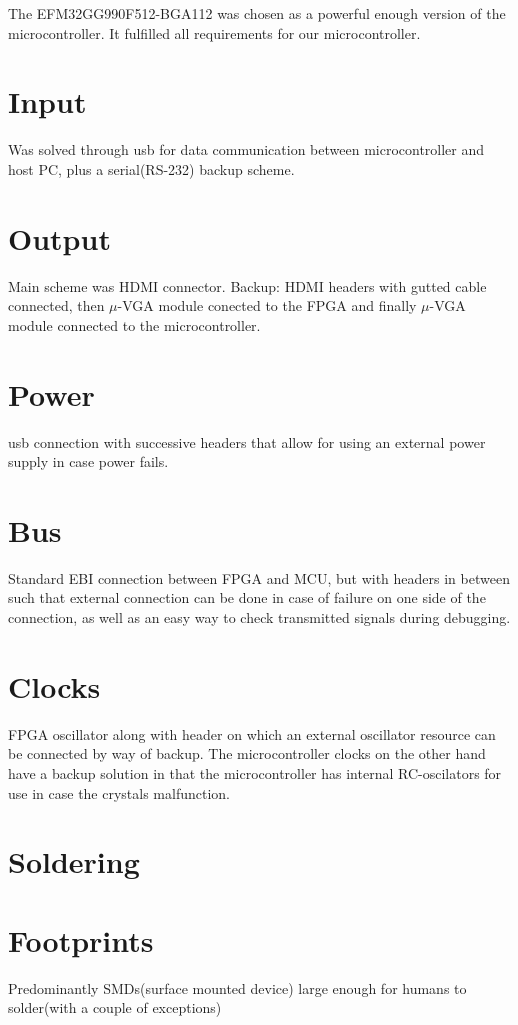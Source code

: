 The EFM32GG990F512-BGA112 was chosen as a powerful enough version of the microcontroller.
It fulfilled all requirements for our microcontroller.

\section{Input}
Was solved through usb for data communication between microcontroller and host PC, plus a serial(RS-232) backup scheme.

\section{Output}
Main scheme was HDMI connector. Backup: HDMI headers with gutted cable connected, then $\mu$-VGA module conected to the FPGA and finally $\mu$-VGA module connected to the microcontroller.

\section{Power}
usb connection with successive headers that allow for using an external power supply in case power fails.

\section{Bus}
Standard EBI connection between FPGA and MCU, but with headers in between such that external connection can be done in case of failure on one side of the connection, as well as an easy way to check transmitted signals during debugging.

\section{Clocks}
FPGA oscillator along with header on which an external oscillator resource can be connected by way of backup.
The microcontroller clocks on the other hand have a backup solution in that the microcontroller has internal RC-oscilators for use in case the crystals malfunction.

\section{Soldering}



\section{Footprints}
Predominantly SMDs(surface mounted device) large enough for humans to solder(with a couple of exceptions)

